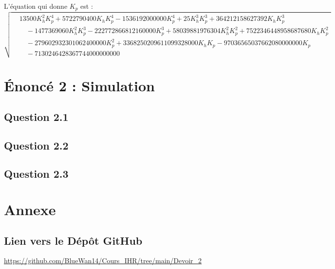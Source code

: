 \documentclass[a4paper,11pt]{article}
\begin{document}
L'équation qui donne $K_p$ est :
\[
\sqrt{
\begin{aligned}
& 13500 K_h^2 K_p^4 + 5722790400 K_h K_p^4 - 1536192000000 K_p^4 + 25 K_h^3 K_p^3 + 364212158627392 K_h K_p^3 \\
& \quad - 1477369060 K_h^2 K_p^3 - 222772866812160000 K_p^3 + 58039881976304 K_h^2 K_p^2 + 7522346448958687680 K_h K_p^2 \\
& \quad - 279602932301062400000 K_p^2 + 3368250209611099328000 K_h K_p - 97036565037662080000000 K_p \\
& \quad - 7130246428367744000000000
\end{aligned}
}
\]



\section{Énoncé 2 : Simulation}
\subsection{Question 2.1}

\subsection{Question 2.2}

\subsection{Question 2.3}

\section{Annexe}
\subsection{Lien vers le Dépôt GitHub}
\url{https://github.com/BlueWan14/Cours_IHR/tree/main/Devoir_2}
\end{document}
